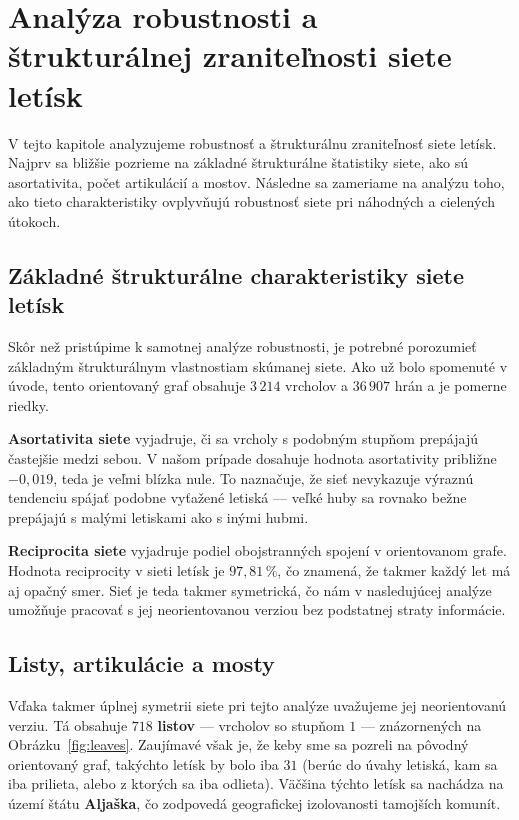 \chapter[Analýza robustnosti a štrukturálnej zraniteľnosti siete letísk \small{(Lucia Ganajová)}]{Analýza robustnosti a štrukturálnej zraniteľnosti siete letísk}
\label{robustness_analysis}
V tejto kapitole analyzujeme robustnosť a štrukturálnu zraniteľnosť siete letísk. Najprv sa bližšie pozrieme na základné štrukturálne štatistiky siete, ako sú asortativita, počet artikulácií a mostov. Následne sa zameriame na analýzu toho, ako tieto charakteristiky ovplyvňujú robustnosť siete pri náhodných a cielených útokoch.

\section{Základné štrukturálne charakteristiky siete letísk}

Skôr než pristúpime k samotnej analýze robustnosti, je potrebné porozumieť základným štrukturálnym vlastnostiam skúmanej siete. Ako už bolo spomenuté v úvode, tento orientovaný graf obsahuje $3\,214$ vrcholov a $36\,907$ hrán a je pomerne riedky.

\textbf{Asortativita siete} vyjadruje, či sa vrcholy s podobným stupňom prepájajú častejšie medzi sebou. V našom prípade dosahuje hodnota asortativity približne $-0{,}019$, teda je veľmi blízka nule. To naznačuje, že sieť nevykazuje výraznú tendenciu spájať podobne vyťažené letiská — veľké huby sa rovnako bežne prepájajú s malými letiskami ako s inými hubmi.

\textbf{Reciprocita siete} vyjadruje podiel obojstranných spojení v orientovanom grafe. Hodnota reciprocity v sieti letísk je $97{,}81\,\%$, čo znamená, že takmer každý let má aj opačný smer. Sieť je teda takmer symetrická, čo nám v nasledujúcej analýze umožňuje pracovať s jej neorientovanou verziou bez podstatnej straty informácie.

\section{Listy, artikulácie a mosty}

Vďaka takmer úplnej symetrii siete pri tejto analýze uvažujeme jej neorientovanú verziu. Tá obsahuje $718$ \textbf{listov} — vrcholov so stupňom $1$ — znázornených na Obrázku~\ref{fig:leaves}. Zaujímavé však je, že keby sme sa pozreli na pôvodný orientovaný graf, takýchto letísk by bolo iba $31$ (berúc do úvahy letiská, kam sa iba prilieta, alebo z ktorých sa iba odlieta). Väčšina týchto letísk sa nachádza na území štátu \textbf{Aljaška}, čo zodpovedá geografickej izolovanosti tamojších komunít.

